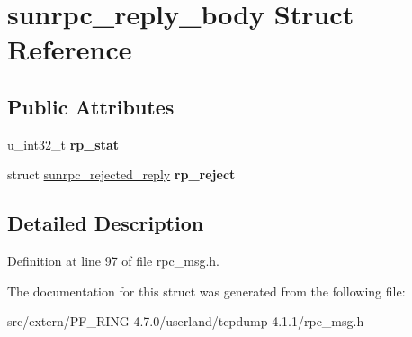 \hypertarget{structsunrpc__reply__body}{
\section{sunrpc\_\-reply\_\-body Struct Reference}
\label{structsunrpc__reply__body}
}
\subsection*{Public Attributes}
\begin{DoxyCompactItemize}
\item 
\hypertarget{structsunrpc__reply__body_a89ef283354096892ea44d34dcf971930}{
u\_\-int32\_\-t {\bfseries rp\_\-stat}}
\label{structsunrpc__reply__body_a89ef283354096892ea44d34dcf971930}

\item 
\hypertarget{structsunrpc__reply__body_a727a242003c6b701e87ad5c75a60dd76}{
struct \hyperlink{structsunrpc__rejected__reply}{sunrpc\_\-rejected\_\-reply} {\bfseries rp\_\-reject}}
\label{structsunrpc__reply__body_a727a242003c6b701e87ad5c75a60dd76}

\end{DoxyCompactItemize}


\subsection{Detailed Description}


Definition at line 97 of file rpc\_\-msg.h.



The documentation for this struct was generated from the following file:\begin{DoxyCompactItemize}
\item 
src/extern/PF\_\-RING-\/4.7.0/userland/tcpdump-\/4.1.1/rpc\_\-msg.h\end{DoxyCompactItemize}
